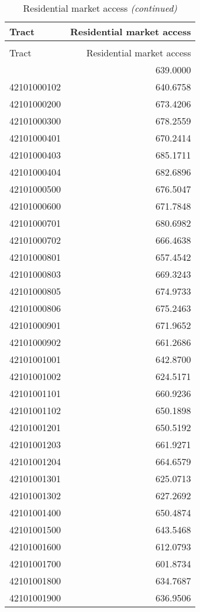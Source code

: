 
\begin{longtable}[t]{lr}
\caption{Residential market access}\\
\toprule
Tract & Residential market access\\
\midrule
\endfirsthead
\caption[]{Residential market access \textit{(continued)}}\\
\toprule
Tract & Residential market access\\
\midrule
\endhead

\endfoot
\bottomrule
\endlastfoot
42101000101 & 639.0000\\
42101000102 & 640.6758\\
42101000200 & 673.4206\\
42101000300 & 678.2559\\
42101000401 & 670.2414\\
42101000403 & 685.1711\\
42101000404 & 682.6896\\
42101000500 & 676.5047\\
42101000600 & 671.7848\\
42101000701 & 680.6982\\
42101000702 & 666.4638\\
42101000801 & 657.4542\\
42101000803 & 669.3243\\
42101000805 & 674.9733\\
42101000806 & 675.2463\\
42101000901 & 671.9652\\
42101000902 & 661.2686\\
42101001001 & 642.8700\\
42101001002 & 624.5171\\
42101001101 & 660.9236\\
42101001102 & 650.1898\\
42101001201 & 650.5192\\
42101001203 & 661.9271\\
42101001204 & 664.6579\\
42101001301 & 625.0713\\
42101001302 & 627.2692\\
42101001400 & 650.4874\\
42101001500 & 643.5468\\
42101001600 & 612.0793\\
42101001700 & 601.8734\\
42101001800 & 634.7687\\
42101001900 & 636.9506\\

\end{longtable}
